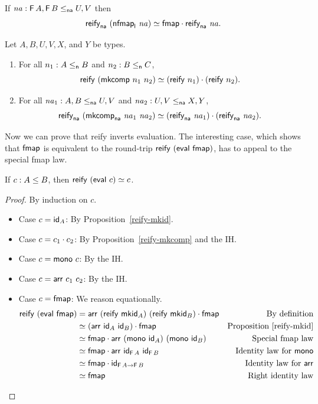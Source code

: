 \documentclass[acmsmall,screen]{acmart}
\begin{document}
\begin{proposition}
  If \(\mathit{na} : \mathsf{F}\, A, \mathsf{F}\, B \leq_{\mathsf{na}} U, V\) then
          \[\mathsf{reify}_{\mathsf{na}}\ (\mathsf{nfmap}_{\mathsf{l}}\ \mathit{na}) \simeq \mathsf{fmap} \cdot \mathsf{reify}_{\mathsf{na}}\ \mathit{na}.\]
\end{proposition}

\begin{proposition}\label{reify-mkcomp}
  Let \(A, B, U, V, X\), and \(Y\) be types.
  \begin{enumerate}
    \item For all \(n_1 : A \leq_{\mathsf{n}} B\) and \(n_2 : B \leq_{\mathsf{n}} C\),
  \[\mathsf{reify}\ (\mathsf{mkcomp}\ n_1\ n_2) \simeq (\mathsf{reify}\ n_1) \cdot (\mathsf{reify}\ n_2).\]
    \item For all \(\mathit{na}_1 : A, B \leq_{\mathsf{na}} U, V\) and \(\mathit{na}_2 : U, V \leq_{\mathsf{na}} X, Y\),
          \[\reifyna\ (\mkcompna\ \na_1\ \na_2) \coeeq \ccomp{(\reifyna\ \na_1)}{(\reifyna\ \na_2)}.\]
  \end{enumerate}
\end{proposition}

Now we can prove that reify inverts evaluation. The interesting case, which
shows that \(\mathsf{fmap}\) is equivalent to the round-trip \(\reify\ (\eval{\cfmap})\),
has to appeal to the special fmap law.
\begin{lemma}\label{reify-eval}
  If \(c : A \leq B\), then \(\mathsf{reify}\ (\mathsf{eval}\ c) \simeq c\).
\end{lemma}
\begin{proof}
  By induction on \(c\).
  \begin{itemize}
    \item Case \(c = \mathsf{id}_{A}\): By Proposition~\ref{reify-mkid}.
    \item Case \(c = c_1 \cdot c_2\): By Proposition~\ref{reify-mkcomp} and the IH.
    \item Case \(c = \mathsf{mono}\ c\): By the IH.
    \item Case \(c = \mathsf{arr}\ c_1\ c_2\): By the IH.
    \item Case \(c = \mathsf{fmap}\): We reason equationally.
          \begin{align*}
\reify\ (\eval{\cfmap})&= \ccomp{\carr\ (\reify\ \mkid{A})\ (\reify\ \mkid{B})}{\cfmap} &\text{By definition}\\
            &\coeeq \ccomp{(\carr\ \cid{A}\ \cid{B})}{\cfmap} &\text{Proposition~\ref{reify-mkid}} \\
            &\coeeq \ccomp{\cfmap}{\carr\ (\cmono\ \cid{A})\ (\cmono\ \cid{B})} &\text{Special fmap law}\\
            &\coeeq \ccomp{\cfmap}{\carr\ \cid{\F A}\ \cid{\F B}} &\text{Identity law for \(\cmono\)}\\
            &\coeeq \ccomp{\cfmap}{\cid{\F A \to \F B}} &\text{Identity law for \(\carr\)}\\
            &\coeeq \cfmap &\text{Right identity law}
          \end{align*}
  \end{itemize}
\end{proof}
\end{document}
